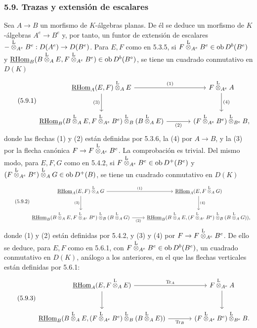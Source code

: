 \subsubsection*{5.9. Trazas y extensión de escalares}

Sea $A\to B$ un morfismo de $K$-álgebras planas. De él se deduce un morfismo de $K$-álgebras $A^e\to B^e$ y, por tanto, un funtor de extensión de escalares $-\overset{\mathrm L}{\otimes}_{A^e}B^e:D(A^e)\to D(B^e)$. Para $E,F$ como en 5.3.5, si $F\overset{\mathrm L}{\otimes}_{A^e}B^e\in\operatorname{ob} D^b(B^e)$ y $\underline{\mathrm{RHom}}_B(B\overset{\mathrm L}{\otimes}_AE,F\overset{\mathrm L}{\otimes}_{A^e}B^e)\in\operatorname{ob} D^b(B^\circ)$, se tiene un cuadrado conmutativo en $D(K)$
\begin{equation}\tag{5.9.1}
\begin{tikzcd}[column sep=large,row sep=large]
\uRHom_A(E,F)\lten_AE \arrow[r,"(1)"] \arrow[d,"(3)"'] & F\lten_{A^e}A \arrow[d,"(4)"]\\
\uRHom_B(B\lten_AE,F\lten_{A^e}B^e)\lten_B(B\lten_AE) \arrow[r,"(2)"'] & (F\lten_{A^e}B^e)\lten_{B^e}B,
\end{tikzcd}
\end{equation}
donde las flechas (1) y (2) están definidas por 5.3.6, la (4) por $A\to B$, y la (3) por la flecha canónica $F\to F\overset{\mathrm L}{\otimes}_{A^e}B^e$. La comprobación es trivial. Del mismo modo, para $E,F,G$ como en 5.4.2, si $F\overset{\mathrm L}{\otimes}_{A^e}B^e\in\operatorname{ob} D^+(B^e)$ y $(F\overset{\mathrm L}{\otimes}_{A^e}B^e)\overset{\mathrm L}{\otimes}_AG\in\operatorname{ob} D^+(B)$, se tiene un cuadrado conmutativo en $D(K)$
\begin{equation}\tag{5.9.2}
\begin{tikzcd}[column sep=normal,row sep=large]
\uRHom_A(E,F)\lten_AG \arrow[r,"(1)"] \arrow[d,"(3)"'] & \uRHom_A(E,F\lten_AG) \arrow[d,"(4)"]\\
\uRHom_B(B\lten_AE,F\lten_{A^e}B^e)\lten_B(B\lten_AG) \arrow[r,"(2)"'] & \uRHom_B(B\lten_AE,(F\lten_{A^e}B^e)\lten_B(B\lten_AG)),
\end{tikzcd}
\end{equation}
donde (1) y (2) están definidas por 5.4.2, y (3) y (4) por $F\to F\overset{\mathrm L}{\otimes}_{A^e}B^e$. De ello se deduce, para $E,F$ como en 5.6.1, con $F\overset{\mathrm L}{\otimes}_{A^e}B^e\in\operatorname{ob} D^b(B^e)$, un cuadrado conmutativo en $D(K)$, análogo a los anteriores, en el que las flechas verticales están definidas por 5.6.1:
\begin{equation}\tag{5.9.3}
\begin{tikzcd}[column sep=large,row sep=large]
\uRHom_A(E,F\lten_AE) \arrow[r,"\Tr_A"] \arrow[d] & F\lten_{A^e}A \arrow[d]\\
\uRHom_B(B\lten_AE,(F\lten_{A^e}B^e)\lten_B(B\lten_AE)) \arrow[r,"\Tr_B"'] & (F\lten_{A^e}B^e)\lten_{B^e}B.
\end{tikzcd}
\end{equation}
